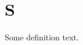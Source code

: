 \documentclass{acmart}
\theoremstyle{plain}
\begin{document}
\section{S}
\begin{definition}\label{def:a} Some definition text.
\end{definition}
\end{document}
